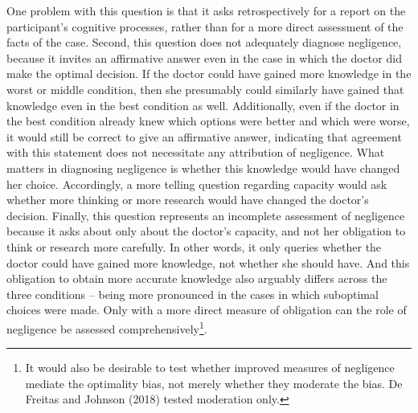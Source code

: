 \documentclass[
  man,floatsintext]{apa6}
\begin{document}
One problem with this question is that it asks retrospectively for a report on the participant's cognitive processes, rather than for a more direct assessment of the facts of the case. Second, this question does not adequately diagnose negligence, because it invites an affirmative answer even in the case in which the doctor did make the optimal decision. If the doctor could have gained more knowledge in the worst or middle condition, then she presumably could similarly have gained that knowledge even in the best condition as well. Additionally, even if the doctor in the best condition already knew which options were better and which were worse, it would still be correct to give an affirmative answer, indicating that agreement with this statement does not necessitate any attribution of negligence. What matters in diagnosing negligence is whether this knowledge would have changed her choice. Accordingly, a more telling question regarding capacity would ask whether more thinking or more research would have changed the doctor's decision. Finally, this question represents an incomplete assessment of negligence because it asks about only about the doctor's capacity, and not her obligation to think or research more carefully. In other words, it only queries whether the doctor could have gained more knowledge, not whether she should have. And this obligation to obtain more accurate knowledge also arguably differs across the three conditions -- being more pronounced in the cases in which suboptimal choices were made. Only with a more direct measure of obligation can the role of negligence be assessed comprehensively\footnote{It would also be desirable to test whether improved measures of negligence mediate the optimality bias, not merely whether they moderate the bias. De Freitas and Johnson (2018) tested moderation only.}.\\
\end{document}
